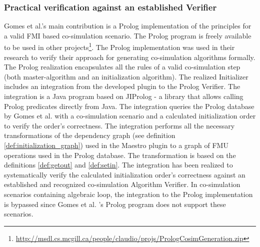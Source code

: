 \subsubsection{Practical verification against an established Verifier} 
Gomes et al.'s \cite{gomes_lucio_vangheluwe_2019} main contribution is a Prolog implementation of the principles for a valid FMI based co-simulation scenario. The Prolog program is freely available to be used in other projects\footnote{\url{http://msdl.cs.mcgill.ca/people/claudio/projs/PrologCosimGeneration.zip}}. The Prolog implementation was used in their research to verify their approach for generating co-simulation algorithms formally. The Prolog realization encapsulates all the rules of a valid co-simulation step (both master-algorithm and an initialization algorithm). 
The realized Initializer includes an integration from the developed plugin to the Prolog Verifier. The integration is a Java program based on JIProlog \cite{JIProlog} - a library that allows calling Prolog predicates directly from Java. The integration queries the Prolog database by Gomes et al. with a co-simulation scenario and a calculated initialization order to verify the order's correctness. The integration performs all the necessary transformations of the dependency graph (see definition \ref{def:initialization_graph}) used in the Maestro plugin to a graph of FMU operations used in the Prolog database. The transformation is based on the definitions \ref{def:getout} and \ref{def:setin}. The integration has been realized to systematically verify the calculated initialization order's correctness against an established and recognized co-simulation Algorithm Verifier. 
In co-simulation scenarios containing algebraic loop, the integration to the Prolog implementation is bypassed since Gomes et al. 's Prolog program does not support these scenarios.
